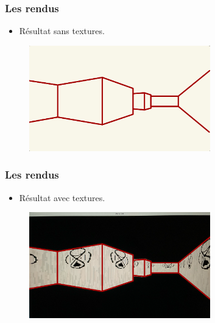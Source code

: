 \documentclass{beamer}
\begin{document}

\begin{frame}
    \frametitle{Les rendus}
    \begin{block}{}
        \begin{itemize}
            \item Résultat sans textures.
        \end{itemize}
    \end{block}
    \begin{figure}
        \centering
        \includegraphics[width=0.7\textwidth]{images/rendu-sans-texture.jpeg}
    \end{figure}
\end{frame}

\begin{frame}
    \frametitle{Les rendus}
    \begin{block}{}
        \begin{itemize}
            \item Résultat avec textures.
        \end{itemize}
    \end{block}
    \begin{figure}
        \centering
        \includegraphics[width=0.7\textwidth]{images/rendu-avec-texture.jpeg}
    \end{figure}
\end{frame}
\end{document}
